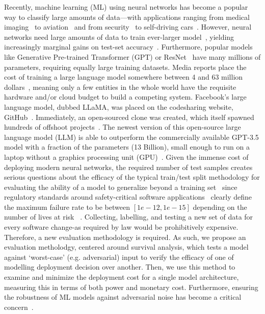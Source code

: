 \documentclass[conference]{IEEEtran}
\begin{document}
Recently, machine learning (ML) using neural networks has become a popular way to classify large amounts of data---with applications ranging from medical imaging~\cite{ai_medical_imaging} to aviation~\cite{ai_aviation} and from security~\cite{ai_security,ai_luggage,ai_prison} to self-driving cars~\cite{ai_automotive}. However, neural networks need large amounts of data\cite{desislavov2021compute,bailly2022effects} to train ever-larger model~\cite{desislavov2021compute}, yielding increasingly marginal gains on test-set accuracy~\cite{sun2017revisiting}. Furthermore, popular models like Generative Pre-trained Transformer (GPT)\cite{floridi2020gpt} or ResNet~\cite{resnet} have many millions of parameters, requiring equally large training datasets. Media reports place the cost of training a large language model somewhere between 4 and 63 million dollars~\cite{Patel_Ahmad_2023,Feswing_2023}, meaning only a few entities in the whole world have the requisite hardware and/or cloud budget to build a competing system. Facebook's large language model, dubbed LLaMA, was placed on the codesharing website, GitHub~\cite{llama}. Immediately, an open-sourced clone was created, which itself spawned hundreds of offshoot projects~\cite{openllama}. The newest version of this open-source large language model (LLM) is able to outperform the commercially available GPT-3.5 model with a fraction of the parameters (13 Billion), small enough to run on a laptop without a graphics processing unit (GPU)~\cite{liu2023goat}. Given the immense cost of deploying modern neural networks, the required number of test samples creates serious questions about the efficacy of the typical train/test split methodology for evaluating the ability of a model to generalize beyond a training set~\cite{meyers} since regulatory standards around safety-critical software applications~\cite{IEC61508,iso26262,aviation_software,safetyframework} clearly define the maximum failure rate to be between $[1e-12, 1e-15]$ depending on the number of lives at risk ~\cite{iso26262}. Collecting, labelling, and testing a new set of data for every software change-as required by law would be prohibitively expensive. Therefore, a new evaluation methodology is required. As such, we propose an evaluation metholodgy, centered around survival analysis, which tests a model against `worst-case' (e.g. adversarial) input to verify the efficacy of one of modelling deployment decision over another. Then, we use this method to examine and minimize the deployment cost for a single model architecture, measuring this in terms of both power and monetary cost. Furthermore, ensuring the robustness of ML models against adversarial noise has become a critical concern~\cite{adversarialpatch, carlini_towards_2017, croce_reliable_2020, hopskipjump, chakraborty2018adversarial, art2018}.  
\end{document}
